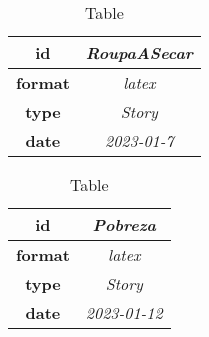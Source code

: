 \begin{table}[h]
    \centering
    \begin{tabular}{|c|c|}
        \hline
        
            \textbf{ id } & \textit{ RoupaASecar } \\
            \hline
        
            \textbf{ format } & \textit{ latex } \\
            \hline
        
            \textbf{ type } & \textit{ Story } \\
            \hline
        
            \textbf{ date } & \textit{ 2023-01-7 } \\
            \hline
        
    \end{tabular}
    \caption{Table } %
    \label{table:\arabic{tablecounter2}} %
\end{table}

\begin{table}[h]
    \centering
    \begin{tabular}{|c|c|}
        \hline
        
            \textbf{ id } & \textit{ Pobreza } \\
            \hline
        
            \textbf{ format } & \textit{ latex } \\
            \hline
        
            \textbf{ type } & \textit{ Story } \\
            \hline
        
            \textbf{ date } & \textit{ 2023-01-12 } \\
            \hline
        
    \end{tabular}
    \caption{Table } %
    \label{table:\arabic{tablecounter2}} %
\end{table}

